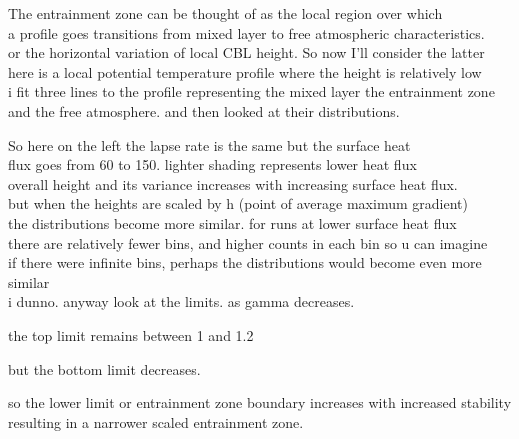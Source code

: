 \documentclass{beamer}
\begin{document}
\begin{frame}
The entrainment zone can be thought of as the local region over which\\
a profile goes transitions from mixed layer to free atmospheric characteristics.\\
or the horizontal variation of local CBL height.  So now I'll consider the latter\\
here is a local potential temperature profile where the height is relatively low\\
i fit three lines to the profile representing the mixed layer the entrainment zone\\
and the free atmosphere.  and then looked at their distributions.\\
\end{frame}

\begin{frame}
So here on the left the lapse rate is the same but the surface heat\\
flux goes from 60 to 150.  lighter shading represents lower heat flux\\
overall height and its variance increases with increasing surface heat flux.\\
but when the heights are scaled by h (point of average maximum gradient)\\
the distributions become more similar.  for runs at lower surface heat flux\\
there are relatively fewer bins, and higher counts in each bin so u can imagine\\
if there were infinite bins, perhaps the distributions would become even more similar\\
i dunno.  anyway look at the limits.  as gamma decreases.
\end{frame}

\begin{frame}
the top limit remains between 1 and 1.2
\end{frame}

\begin{frame}
but the bottom limit decreases.
\end{frame}

\begin{frame}
\end{frame}



\begin{frame}
so the lower limit or entrainment zone boundary increases with increased stability\\
resulting in a narrower scaled entrainment zone.
\end{frame}
\end{document}
